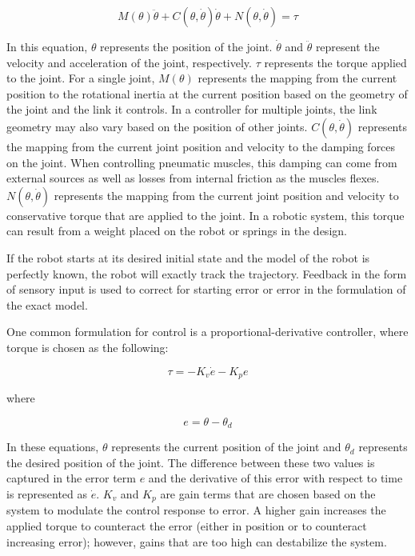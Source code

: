 \begin{equation}
M(\theta) \ddot{\theta} + C(\theta, \dot{\theta}) \dot{\theta} + N(\theta, \dot{\theta}) = \tau
\end{equation}

In this equation, $\theta$ represents the position of the joint. $\dot{\theta}$ and $\ddot{\theta}$ represent the velocity and acceleration of the joint, respectively. $\tau$ represents the torque applied to the joint. For a single joint, $M(\theta)$ represents the mapping from the current position to the rotational inertia at the current position based on the geometry of the joint and the link it controls. In a controller for multiple joints, the link geometry may also vary based on the position of other joints. $C(\theta, \dot{\theta})$ represents the mapping from the current joint position and velocity to the damping forces on the joint. When controlling pneumatic muscles, this damping can come from external sources as well as losses from internal friction as the muscles flexes. $N(\theta, \dot{\theta})$ represents the mapping from the current joint position and velocity to conservative torque that are applied to the joint. In a robotic system, this torque can result from a weight placed on the robot or springs in the design.

If the robot starts at its desired initial state and the model of the robot is
perfectly known, the robot will exactly track the trajectory. Feedback in the 
form of sensory input is used to correct for starting error or error in the 
formulation of the exact model.

One common formulation for control is a proportional-derivative controller, 
where torque is chosen as the following:

\begin{equation}
\tau = -K_{v} \dot{e} - K_{p} e
\end{equation}

where

\begin{equation}
e = \theta - \theta_{d}
\end{equation}

In these equations, $\theta$ represents the current position of the joint and $\theta_{d}$ represents the desired position of the joint. The difference between these two values is captured in the error term $e$ and the derivative of this error with respect to time is represented as $\dot{e}$. $K_{v}$ and $K_{p}$ are gain terms that are chosen based on the system to modulate the control response to error. A higher gain increases the applied torque to counteract the error (either in position or to counteract increasing error); however, gains that are too high can destabilize the system.

